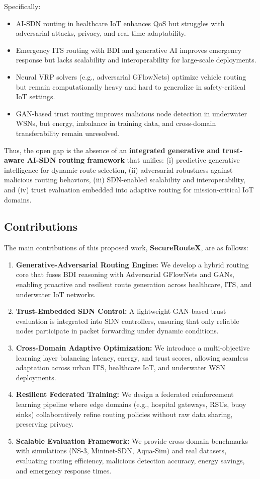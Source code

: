 \documentclass[a4paper,fleqn]{cas-dc}
\numberwithin{equation}{section}
\begin{document}
Specifically:  
\begin{itemize}
    \item AI-SDN routing in healthcare IoT enhances QoS but struggles with adversarial attacks, privacy, and real-time adaptability.  
    \item Emergency ITS routing with BDI and generative AI improves emergency response but lacks scalability and interoperability for large-scale deployments.  
    \item Neural VRP solvers (e.g., adversarial GFlowNets) optimize vehicle routing but remain computationally heavy and hard to generalize in safety-critical IoT settings.  
    \item GAN-based trust routing improves malicious node detection in underwater WSNs, but energy, imbalance in training data, and cross-domain transferability remain unresolved.  
\end{itemize}  

Thus, the open gap is the absence of an \textbf{integrated generative and trust-aware AI-SDN routing framework} that unifies:  
(i) predictive generative intelligence for dynamic route selection,  
(ii) adversarial robustness against malicious routing behaviors,  
(iii) SDN-enabled scalability and interoperability, and  
(iv) trust evaluation embedded into adaptive routing for mission-critical IoT domains.  

\subsection{Contributions}
The main contributions of this proposed work, \textbf{SecureRouteX}, are as follows:
\begin{enumerate}
    \item \textbf{Generative-Adversarial Routing Engine:} We develop a hybrid routing core that fuses BDI reasoning with Adversarial GFlowNets and GANs, enabling proactive and resilient route generation across healthcare, ITS, and underwater IoT networks.  
    \item \textbf{Trust-Embedded SDN Control:} A lightweight GAN-based trust evaluation is integrated into SDN controllers, ensuring that only reliable nodes participate in packet forwarding under dynamic conditions.  
    \item \textbf{Cross-Domain Adaptive Optimization:} We introduce a multi-objective learning layer balancing latency, energy, and trust scores, allowing seamless adaptation across urban ITS, healthcare IoT, and underwater WSN deployments.  
    \item \textbf{Resilient Federated Training:} We design a federated reinforcement learning pipeline where edge domains (e.g., hospital gateways, RSUs, buoy sinks) collaboratively refine routing policies without raw data sharing, preserving privacy.  
    \item \textbf{Scalable Evaluation Framework:} We provide cross-domain benchmarks with simulations (NS-3, Mininet-SDN, Aqua-Sim) and real datasets, evaluating routing efficiency, malicious detection accuracy, energy savings, and emergency response times.  
\end{enumerate}
\end{document}
